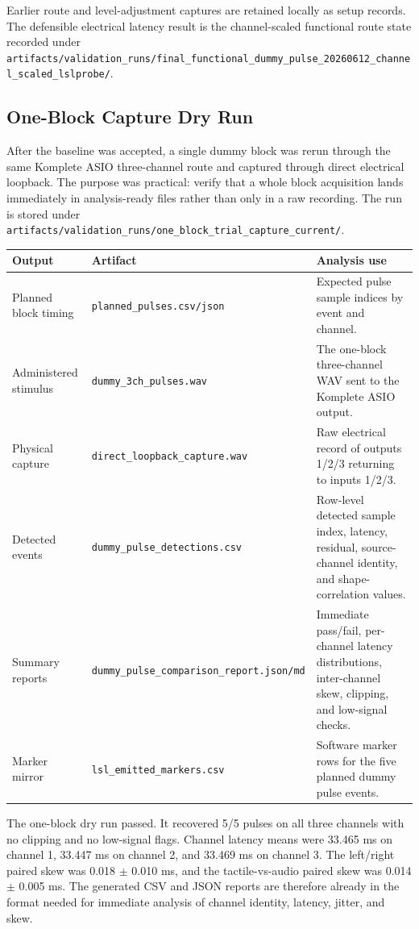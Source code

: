 \documentclass[11pt]{article}
\begin{document}
Earlier route and level-adjustment captures are retained locally as setup
records. The defensible electrical latency result is the channel-scaled
functional route state recorded under
\texttt{artifacts/validation\_runs/final\_functional\_dummy\_pulse\_20260612\_channel\_scaled\_lslprobe/}.

\subsection{One-Block Capture Dry Run}

After the baseline was accepted, a single dummy block was rerun through the
same Komplete ASIO three-channel route and captured through direct electrical
loopback. The purpose was practical: verify that a whole block acquisition
lands immediately in analysis-ready files rather than only in a raw recording.
The run is stored under
\texttt{artifacts/validation\_runs/one\_block\_trial\_capture\_current/}.

\begin{longtable}{|p{}|p{}|p{}|}
\hline
\textbf{Output} & \textbf{Artifact} & \textbf{Analysis use} \\
\hline
Planned block timing & \texttt{planned\_pulses.csv/json} & Expected pulse
sample indices by event and channel. \\
\hline
Administered stimulus & \texttt{dummy\_3ch\_pulses.wav} & The one-block
three-channel WAV sent to the Komplete ASIO output. \\
\hline
Physical capture & \texttt{direct\_loopback\_capture.wav} & Raw electrical
record of outputs 1/2/3 returning to inputs 1/2/3. \\
\hline
Detected events & \texttt{dummy\_pulse\_detections.csv} & Row-level detected
sample index, latency, residual, source-channel identity, and shape-correlation
values. \\
\hline
Summary reports & \texttt{dummy\_pulse\_comparison\_report.json/md} & Immediate
pass/fail, per-channel latency distributions, inter-channel skew, clipping, and
low-signal checks. \\
\hline
Marker mirror & \texttt{lsl\_emitted\_markers.csv} & Software marker rows for
the five planned dummy pulse events. \\
\hline
\end{longtable}

The one-block dry run passed. It recovered 5/5 pulses on all three channels
with no clipping and no low-signal flags. Channel latency means were 33.465 ms
on channel 1, 33.447 ms on channel 2, and 33.469 ms on channel 3. The
left/right paired skew was 0.018 $\pm$ 0.010 ms, and the tactile-vs-audio
paired skew was 0.014 $\pm$ 0.005 ms. The generated CSV and JSON reports are
therefore already in the format needed for immediate analysis of channel
identity, latency, jitter, and skew.
\end{document}
